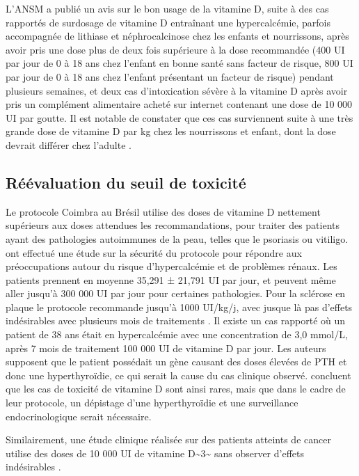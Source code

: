 \documentclass[
  a4paper,
  DIV=11,
  numbers=noendperiod,
  listof=totoc]{scrreprt}
\begin{document}
L'ANSM a publié un avis sur le bon usage de la vitamine D, suite à des
cas rapportés de surdosage de vitamine D entraînant une hypercalcémie,
parfois accompagnée de lithiase et néphrocalcinose chez les enfants et
nourrissons, après avoir pris une dose plus de deux fois supérieure à la
dose recommandée (400 UI par jour de 0 à 18 ans chez l'enfant en bonne
santé sans facteur de risque, 800 UI par jour de 0 à 18 ans chez
l'enfant présentant un facteur de risque) pendant plusieurs semaines, et
deux cas d'intoxication sévère à la vitamine D après avoir pris un
complément alimentaire acheté sur internet contenant une dose de 10 000
UI par goutte. Il est notable de constater que ces cas surviennent suite
à une très grande dose de vitamine D par kg chez les nourrissons et
enfant, dont la dose devrait différer chez l'adulte
\autocite{ANSM.2021}.

\hypertarget{ruxe9uxe9valuation-du-seuil-de-toxicituxe9}{%
\subsection{Réévaluation du seuil de
toxicité}\label{ruxe9uxe9valuation-du-seuil-de-toxicituxe9}}

Le protocole Coimbra au Brésil utilise des doses de vitamine D nettement
supérieurs aux doses attendues les recommandations, pour traiter des
patients ayant des pathologies autoimmunes de la peau, telles que le
psoriasis ou vitiligo. \textcite{Amon.2022} ont effectué une étude sur
la sécurité du protocole pour répondre aux préoccupations autour du
risque d'hypercalcémie et de problèmes rénaux. Les patients prennent en
moyenne 35,291 ± 21,791 UI par jour, et peuvent même aller jusqu'à 300
000 UI par jour pour certaines pathologies. Pour la sclérose en plaque
le protocole recommande jusqu'à 1000 UI/kg/j, avec jusque là pas
d'effets indésirables avec plusieurs mois de traitements
\textcite{Lemke.2021}. Il existe un cas rapporté où un patient de 38 ans
était en hypercalcémie avec une concentration de 3,0 mmol/L, après 7
mois de traitement 100 000 UI de vitamine D par jour. Les auteurs
supposent que le patient possédait un gène causant des doses élevées de
PTH et donc une hyperthyroïdie, ce qui serait la cause du cas clinique
observé. \textcite{Lemke.2021} concluent que les cas de toxicité de
vitamine D sont ainsi rares, mais que dans le cadre de leur protocole,
un dépistage d'une hyperthyroïdie et une surveillance endocrinologique
serait nécessaire.

Similairement, une étude clinique réalisée sur des patients atteints de
cancer utilise des doses de 10 000 UI de vitamine
D\textasciitilde3\textasciitilde{} sans observer d'effets indésirables
\autocite{Amir.2010}.
\end{document}
